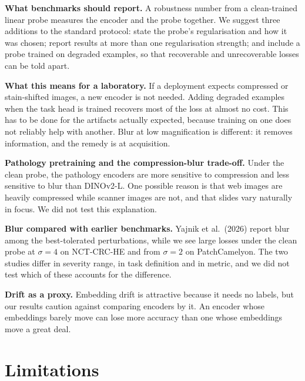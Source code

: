 \documentclass[11pt,a4paper]{article}
\begin{document}
\textbf{What benchmarks should report.} A robustness number from a clean-trained linear probe measures the encoder and the probe together. We suggest three additions to the standard protocol: state the probe's regularisation and how it was chosen; report results at more than one regularisation strength; and include a probe trained on degraded examples, so that recoverable and unrecoverable losses can be told apart.

\textbf{What this means for a laboratory.} If a deployment expects compressed or stain-shifted images, a new encoder is not needed. Adding degraded examples when the task head is trained recovers most of the loss at almost no cost. This has to be done for the artifacts actually expected, because training on one does not reliably help with another. Blur at low magnification is different: it removes information, and the remedy is at acquisition.

\textbf{Pathology pretraining and the compression-blur trade-off.} Under the clean probe, the pathology encoders are more sensitive to compression and less sensitive to blur than DINOv2-L. One possible reason is that web images are heavily compressed while scanner images are not, and that slides vary naturally in focus. We did not test this explanation.

\textbf{Blur compared with earlier benchmarks.} Yajnik et al.\ (2026) report blur among the best-tolerated perturbations, while we see large losses under the clean probe at $\sigma = 4$ on NCT-CRC-HE and from $\sigma = 2$ on PatchCamelyon. The two studies differ in severity range, in task definition and in metric, and we did not test which of these accounts for the difference.

\textbf{Drift as a proxy.} Embedding drift is attractive because it needs no labels, but our results caution against comparing encoders by it. An encoder whose embeddings barely move can lose more accuracy than one whose embeddings move a great deal.

\section{Limitations}
\end{document}
